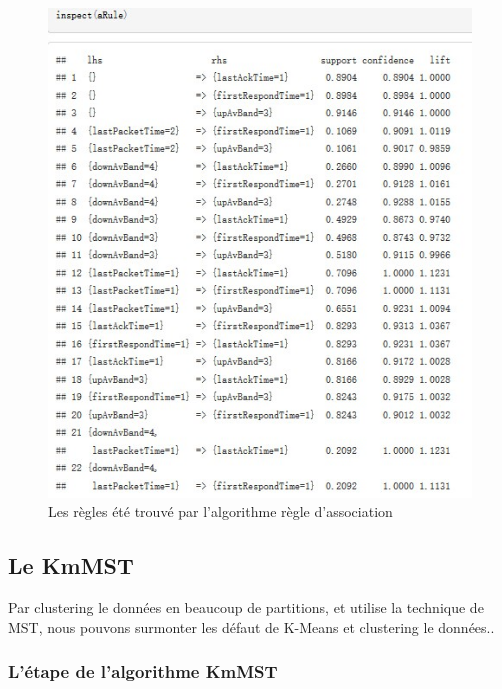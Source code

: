 \begin{figure}[H]
\centering
\includegraphics[width=0.8\linewidth]{images/newar}
\caption{Les règles été trouvé par l'algorithme règle d'association  }
\label{fig:newar}
\end{figure}

\subsection{Le KmMST}
 Par clustering le données en beaucoup de partitions, et utilise la technique de MST, nous pouvons surmonter les défaut de K-Means et clustering le données..
 
  \subsubsection{L'étape de l'algorithme KmMST}
  
